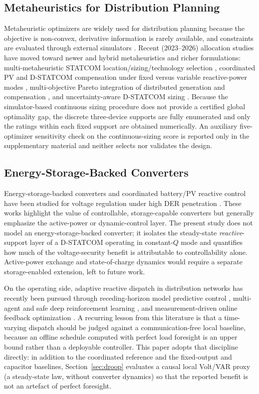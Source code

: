 \documentclass{ieeeaccess}
\begin{document}
\subsection{Metaheuristics for Distribution Planning}
Metaheuristic optimizers are widely used for distribution planning because the
objective is non-convex, derivative information is rarely available, and
constraints are evaluated through external simulators
\cite{keane2013dgplanning,georgilakis2013dgplacement,kennedy1995pso}. Recent
(2023--2026) allocation studies have moved toward newer and hybrid metaheuristics
and richer formulations: multi-metaheuristic STATCOM location/sizing/technology
selection \cite{statcom2025cmes}, coordinated PV and D-STATCOM compensation under
fixed versus variable reactive-power modes \cite{pvdstatcom2025fixedvar},
multi-objective Pareto integration of distributed generation and compensation
\cite{pareto2024dgcomp}, and uncertainty-aware D-STATCOM sizing
\cite{estatcom2024egwo}. Because the simulator-based continuous sizing procedure
does not provide a certified global optimality gap, the discrete three-device
supports are fully enumerated and only the ratings within each fixed support are
obtained numerically. An auxiliary five-optimizer
sensitivity check on the continuous-sizing score is reported only in the
supplementary material and neither selects nor validates the design.

\subsection{Energy-Storage-Backed Converters}
Energy-storage-backed converters and coordinated battery/PV reactive control
have been studied for voltage regulation under high DER penetration
\cite{zeraati2018bess,kabir2014pvbess}. These works
highlight the value of controllable, storage-capable converters but generally
emphasize the active-power or dynamic-control layer. The present study does not
model an energy-storage-backed converter; it isolates the steady-state
\emph{reactive}-support layer of a D-STATCOM operating in constant-$Q$ mode and
quantifies how much of the voltage-security benefit is attributable to
controllability alone. Active-power exchange and state-of-charge dynamics would
require a separate storage-enabled extension, left to future work.

On the operating side, adaptive reactive dispatch in distribution networks has
recently been pursued through receding-horizon model predictive control
\cite{rahman2024mpc,dar2024ccmpc}, multi-agent and safe deep reinforcement
learning \cite{hua2025safedrl,zheng2025marl}, and measurement-driven online
feedback optimization \cite{zhan2024ofo}. A recurring lesson from this
literature is that a time-varying dispatch should be judged against a
communication-free local baseline, because an offline schedule computed with
perfect load foresight is an upper bound rather than a deployable controller. This
paper adopts that discipline directly: in addition to the coordinated reference
and the fixed-output and capacitor baselines, Section~\ref{sec:droop} evaluates a
causal local Volt/VAR proxy (a steady-state law, without converter dynamics) so
that the reported benefit is not an artefact of perfect foresight.
\end{document}
